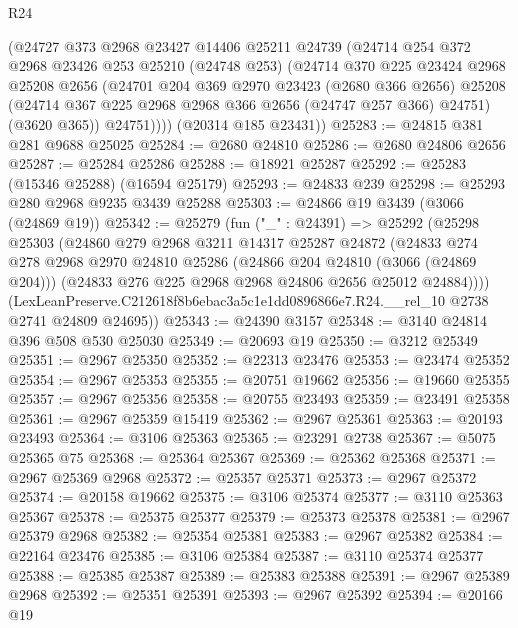 \begin{lexlean}{R24}
\begin{coremodule}
        (@24727
          @373
          @2968
          @23427
          @14406
          @25211
          @24739
          (@24714
            @254
            @372
            @2968
            @23426
            @253
            @25210
            (@24748 @253)
            (@24714
              @370
              @225
              @23424
              @2968
              @25208
              @2656
              (@24701
                @204
                @369
                @2970
                @23423
                (@2680 @366 @2656)
                @25208
                (@24714 @367 @225 @2968 @2968 @366 @2656 (@24747 @257 @366) @24751)
                (@3620 @365))
              @24751))))
      (@20314 @185 @23431))
@25283 := @24815 @381 @281 @9688 @25025
@25284 := @2680 @24810
@25286 := @2680 @24806 @2656
@25287 := @25284 @25286
@25288 := @18921 @25287
@25292 := @25283 (@15346 @25288) (@16594 @25179)
@25293 := @24833 @239
@25298 := @25293 @280 @2968 @9235 @3439 @25288
@25303 := @24866 @19 @3439 (@3066 (@24869 @19))
@25342 := @25279
    (fun ("_" : @24391) =>
    @25292
      (@25298
        @25303
        (@24860
          @279
          @2968
          @3211
          @14317
          @25287
          @24872
          (@24833
            @274
            @278
            @2968
            @2970
            @24810
            @25286
            (@24866 @204 @24810 (@3066 (@24869 @204)))
            (@24833 @276 @225 @2968 @2968 @24806 @2656 @25012 @24884))))
      (LexLeanPreserve.C212618f8b6ebac3a5c1e1dd0896866e7.R24.__rel_10 @2738 @2741 @24809 @24695))
@25343 := @24390 @3157
@25348 := @3140 @24814 @396 @508 @530 @25030
@25349 := @20693 @19
@25350 := @3212 @25349
@25351 := @2967 @25350
@25352 := @22313 @23476
@25353 := @23474 @25352
@25354 := @2967 @25353
@25355 := @20751 @19662
@25356 := @19660 @25355
@25357 := @2967 @25356
@25358 := @20755 @23493
@25359 := @23491 @25358
@25361 := @2967 @25359 @15419
@25362 := @2967 @25361
@25363 := @20193 @23493
@25364 := @3106 @25363
@25365 := @23291 @2738
@25367 := @5075 @25365 @75
@25368 := @25364 @25367
@25369 := @25362 @25368
@25371 := @2967 @25369 @2968
@25372 := @25357 @25371
@25373 := @2967 @25372
@25374 := @20158 @19662
@25375 := @3106 @25374
@25377 := @3110 @25363 @25367
@25378 := @25375 @25377
@25379 := @25373 @25378
@25381 := @2967 @25379 @2968
@25382 := @25354 @25381
@25383 := @2967 @25382
@25384 := @22164 @23476
@25385 := @3106 @25384
@25387 := @3110 @25374 @25377
@25388 := @25385 @25387
@25389 := @25383 @25388
@25391 := @2967 @25389 @2968
@25392 := @25351 @25391
@25393 := @2967 @25392
@25394 := @20166 @19

\end{coremodule}
\end{lexlean}
